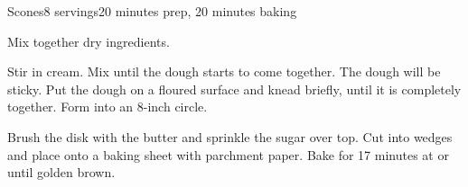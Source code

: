 \documentclass[../Cookbook.tex]{subfiles}
\begin{document}
\begin{recipe}{Scones}{8 servings}{20 minutes prep, 20 minutes baking}

Mix together dry ingredients.

Stir in cream. Mix until the dough starts to come together. The dough will be sticky. Put the dough on a floured surface and knead briefly, until it is completely together. Form into an 8-inch circle.

Brush the disk with the butter and sprinkle the sugar over top. Cut into wedges and place onto a baking sheet with parchment paper. Bake for 17 minutes at  or until golden brown.

\end{recipe}
\end{document}
